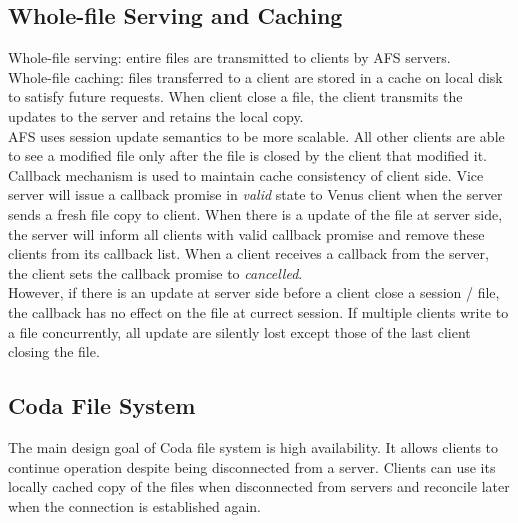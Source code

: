 \begin{multicols*}{2}
\subsection{Whole-file Serving and Caching}

\noindent Whole-file serving: entire files are transmitted to clients by AFS servers.\\

\noindent Whole-file caching: files transferred to a client are stored in a cache on local disk to satisfy future requests. When client close a file, the client transmits the updates to the server and retains the local copy.\\

\noindent AFS uses session update semantics to be more scalable. All other clients are able to see a modified file only after the file is closed by the client that modified it.\\

\noindent Callback mechanism is used to maintain cache consistency of client side. Vice server will issue a callback promise in \textit{valid} state to Venus client when the server sends a fresh file copy to client. When there is a update of the file at server side, the server will inform all clients with valid callback promise and remove these clients from its callback list. When a client receives a callback from the server, the client sets the callback promise to \textit{cancelled}.\\

\noindent However, if there is an update at server side before a client close a session / file, the callback has no effect on the file at currect session. If multiple clients write to a file concurrently, all update are silently lost except those of the last client closing the file. 

\subsection{Coda File System}

\noindent The main design goal of Coda file system is high availability. It allows clients to continue operation despite being disconnected from a server. Clients can use its locally cached copy of the files when disconnected from servers and reconcile later when the connection is established again. \\


\end{multicols*}
